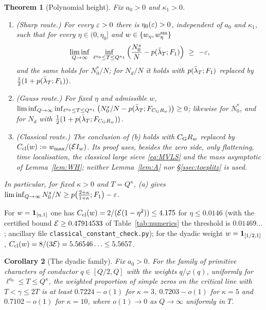 \documentclass[11pt]{amsart}
\newtheorem{theorem}{Theorem}[section]
\newtheorem{corollary}[theorem]{Corollary}
\theoremstyle{definition}
\theoremstyle{remark}
\numberwithin{equation}{section}
\begin{document}
\begin{theorem}[Polynomial height]\label{thm:poly}
Fix $a_0>0$ and $\kappa_1>0$.
\begin{enumerate}[label=(\alph*)]
\item \emph{(Sharp route.)} For every $\varepsilon>0$ there is $\eta_0(\varepsilon)>0$, independent of $a_0$ and $\kappa_1$, such that for every $\eta\in(0,\eta_0]$ and $w\in\{w_\eta,w^{\mathrm{sm}}_\eta\}$
\[
\liminf_{Q\to\infty}\ \inf_{\ell^{a_0}\le T\le Q^{\kappa_1}}\Big(\frac{N^s_0}N-\pC(\bet_T;F_1)\Big)\ \ge\ -\eps,
\]
and the same holds for $N^*_0/N$; for $N_d/N$ it holds with $p(\bar\lambda_T;F_1)$ replaced by $\frac12(1+p(\bar\lambda_T;F_1))$.
\item \emph{(Gauss route.)} For fixed $\eta$ and admissible $w$, $\liminf_{Q\to\infty}\inf_{\ell^{a_0}\le T\le Q^{\kappa_1}}\big(N^s_0/N-p(\bar\lambda_T;F_{C_{\mathrm G}R_w})\big)\ge0$; likewise for $N^*_0$, and for $N_d$ with $\frac12(1+p(\bar\lambda_T;F_{C_{\mathrm G}R_w}))$.
\item \emph{(Classical route.)} The conclusion of (b) holds with $C_{\mathrm G}R_w$ replaced by $C_{\mathrm{cl}}(w):=w_{\max}/(\mathcal EI_w)$. Its proof uses, besides the zero side, only flattening, time localisation, the classical large sieve \eqref{eq:MVLS} and the mass asymptotic of Lemma~\ref{lem:WH}; neither Lemma~\ref{lem:A} nor \S\ref{ssec:toeplitz} is used.
\end{enumerate}
In particular, for fixed $\kappa>0$ and $T=Q^\kappa$, (a) gives $\liminf_{Q\to\infty}N^s_0/N\ge p\big(\frac{2+\kappa}{1+\kappa};F_1\big)-\varepsilon$.
\end{theorem}

For $w=\mathbf 1_{[\eta,1]}$ one has $C_{\mathrm{cl}}(w)=2/(\mathcal E(1-\eta^2))\le4.175$ for $\eta\le0.0146$ (with the certified bound $\mathcal E\ge0.47914533$ of Table~\ref{tab:numerics} the threshold is $0.01469\ldots$; ancillary file \texttt{classical\_constant\_check.py}); for the dyadic weight $w=\mathbf 1_{[1/2,1]}$, $C_{\mathrm{cl}}(w)=8/(3\mathcal E)=5.56546\ldots\le5.5657$.

\begin{corollary}[The dyadic family]\label{cor:dyadic}
Fix $a_0>0$. For the family of primitive characters of conductor $q\in[Q/2,Q]$ with the weights $q/\varphi(q)$, uniformly for $\ell^{a_0}\le T\le Q^{\kappa}$, the weighted proportion of simple zeros on the critical line with $T<\gamma\le2T$ is at least $0.7224-o(1)$ for $\kappa=3$, $0.7203-o(1)$ for $\kappa=5$ and $0.7102-o(1)$ for $\kappa=10$, where $o(1)\to0$ as $Q\to\infty$ uniformly in $T$.
\end{corollary}
\end{document}
